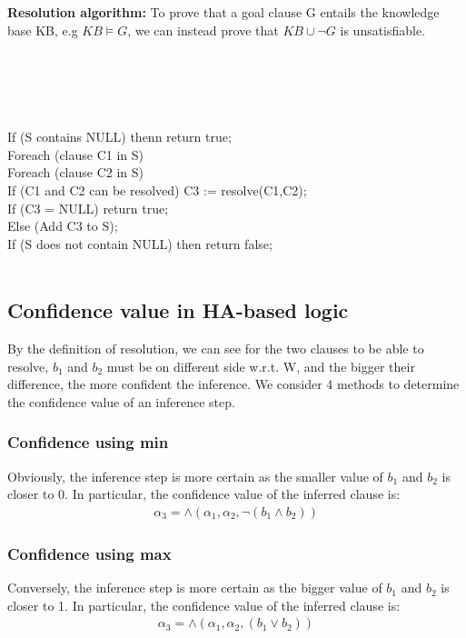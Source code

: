 \documentclass[26pt,fleqn,]{article}
\begin{document}
{\bfseries Resolution algorithm:} 
 To prove that a goal clause G entails the knowledge base KB, e.g \(KB \models G\), we can instead prove
that \(KB \cup \neg G\) is unsatisfiable.\\\\
\\
\\\\
\\
\indent If (S contains NULL) thenn return true;\\
\indent Foreach (clause C1 in S)\\
\indent \indent Foreach (clause C2 in S)\\
\indent \indent \indent If (C1 and C2 can be resolved) C3 := resolve(C1,C2);\\
\indent \indent \indent If (C3 = NULL) return true;\\
\indent \indent \indent Else (Add C3 to S);\\
\indent If (S does not contain NULL) then return false;\\
\\


\subsection{Confidence value in HA-based logic}
By the definition of resolution, we can see for the two clauses to be able to resolve, \(b_1\) and 
\(b_2\) must be on different side w.r.t. W, and the bigger their difference, the more confident the 
inference. We consider 4 methods to determine the confidence value of an inference step.\\
\subsubsection{Confidence using min}
Obviously, the inference step is more certain as the smaller value of \(b_1\) and \(b_2\) is closer to 
0. In particular, the confidence value of the inferred clause is:
\begin{align*}
	{\alpha}_3 = \wedge({\alpha}_1, {\alpha}_2, \neg(b_1 \wedge b_2))
\end{align*}
\subsubsection{Confidence using max}
Conversely, the inference step is more certain as the bigger value of \(b_1\) and \(b_2\) is closer to 
1. In particular, the confidence value of the inferred clause is:
\begin{align*}
	{\alpha}_3 = \wedge({\alpha}_1, {\alpha}_2, (b_1 \vee b_2))
\end{align*}
\end{document}
